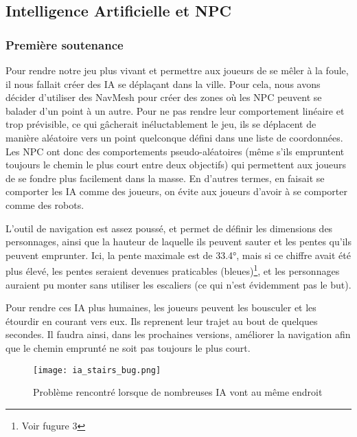 \subsection{Intelligence Artificielle et NPC}

    \vspace{0.5cm}
    \subsubsection{Première soutenance}
    \vspace{0.5cm}

        Pour rendre notre jeu plus vivant et permettre aux joueurs de se mêler à la foule,
        il nous fallait créer des IA se déplaçant dans la ville.
        Pour cela, nous avons décider d'utiliser des NavMesh pour créer des zones où les 
        NPC peuvent se balader d'un point à un autre.
        Pour ne pas rendre leur comportement linéaire et trop prévisible, ce qui gâcherait inéluctablement le jeu,
        ils se déplacent de manière aléatoire  vers un point quelconque défini dans une liste de coordonnées.
        Les NPC ont donc des comportements pseudo-aléatoires (même s'ils empruntent toujours le chemin le plus court entre deux objectifs) qui permettent
        aux joueurs de se fondre plus facilement dans la masse. En d'autres termes, en faisait se comporter les IA comme des joueurs, on évite aux joueurs
        d'avoir à se comporter comme des robots.

        L’outil de navigation est assez poussé, et permet de définir les dimensions des personnages,
        ainsi que la hauteur de laquelle ils peuvent sauter et les pentes qu’ils peuvent emprunter.
        Ici, la pente maximale est de 33.4°, mais si ce chiffre avait été plus élevé,
        les pentes seraient devenues praticables (bleues)\footnote{Voir fugure 3}, et les personnages auraient pu
        monter sans utiliser les escaliers (ce qui n’est évidemment pas le but).


        Pour rendre ces IA plus humaines, les joueurs peuvent les bousculer et les étourdir en courant vers eux.
        Ils reprenent leur trajet au bout de quelques secondes. Il faudra ainsi, dans les prochaines versions, 
        améliorer la navigation afin que le chemin emprunté ne soit pas toujours le plus court. 
        

        \begin{figure}[!hbt]
                \centering
                \texttt{[image: ia\_stairs\_bug.png]}
                \caption{Problème rencontré lorsque de nombreuses IA vont au même endroit}
        \end{figure}
        \FloatBarrier

